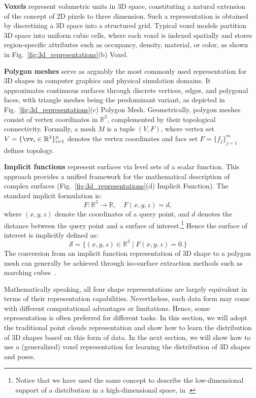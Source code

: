 \documentclass[../../book-main.tex]{subfiles}
\begin{document}
\textbf{Voxels}
represent volumetric units in 3D space, constituting a natural
extension of the concept of 2D pixels to three dimension. Such a
representation is obtained by discretizing a 3D space into a structured grid.
Typical voxel models partition 3D space into uniform cubic cells,
where each voxel is indexed spatially and stores region-specific
attributes such as occupancy, density, material, or color, as shown
in Fig.~\ref{fig:3d_representations}(b) Voxel.

\textbf{Polygon meshes}
serve as arguably the most commonly used representation for 3D shapes
in computer graphics and physical simulation domains. It approximates
continuous surfaces through discrete  vertices, edges, and polygonal
faces, with triangle meshes being the predominant variant, as
depicted in Fig.~\ref{fig:3d_representations}(c) Polygon Mesh.
Geometrically, polygon meshes consist of vertex coordinates in $\mathbb{R}^3$,
complemented by their topological connectivity. Formally, a mesh $M$ is a tuple
$(V,F)$, where vertex set $V=\{\vv_i\in\mathbb{R}^3\}_{i=1}^n$
denotes the vertex coordinates and face set $F=\{f_j\}_{j=1}^m$
defines topology.

\textbf{Implicit functions}
represent surfaces via level sets of a scalar function. This approach
provides a unified framework for the mathematical description of
complex surfaces (Fig.~\ref{fig:3d_representations}(d) Implicit Function).
The standard implicit formulation is:
\begin{equation}
\label{eq:implicit_function}
F: \mathbb{R}^3 \rightarrow \mathbb{R}, \quad F(x,y,z) = d,
\end{equation}
where $(x,y,z)$ denote the coordinates of a query point, and $d$
denotes the distance between the query point and a surface of
interest.\footnote{Notice that we have used the same concept to
describe the low-dimensional support of a distribution in a
high-dimensional space, in .} Hence the
surface of interest is implicitly defined as:
\begin{equation}
\label{eq:implicit_function_surface}
\mathcal{S} = \{ (x,y,z) \in \mathbb{R}^3 \mid F(x,y,z)=0. \}
\end{equation}
The conversion from an implicit function representation of 3D shape
to a polygon mesh can generally be achieved through iso-surface
extraction methods such as marching cubes~\cite{10.1145/280811.281026}.

Mathematically speaking, all four shape representations are largely
equivalent in terms of their representation capabilities.
Nevertheless, each data form may come with different computational
advantages or limitations. Hence, some representation is often
preferred for different tasks. In this section, we will adopt the
traditional point clouds representation and show how to learn the
distribution of 3D shapes based on this form of data. In the next
section, we will show how to use a (generalized) voxel representation
for learning the distribution of 3D shapes and poses.
\end{document}
